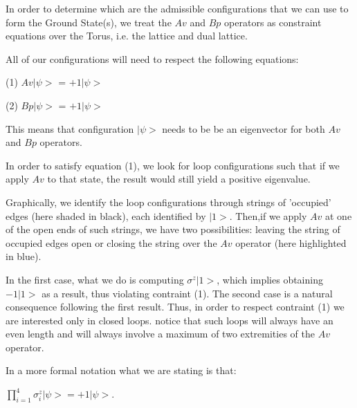 \documentclass[12pt]{report}
\begin{document}
	
	\begin{minipage}{1\textwidth}
		
		In order to determine which are the admissible configurations that we can use to form the Ground State(s), we treat the $Av$ and $Bp$ operators as constraint equations over the Torus, i.e. the lattice and dual lattice.\newline
		
		All of our configurations will need to respect the following equations:\newline
		
		\begin{center}
		 (1)	$Av|\psi>$ = $+1|\psi>$
		\end{center}
		
		\begin{center}
		 (2)	$Bp|\psi>$ = $+1|\psi>$
		\end{center}
		
		This means that configuration $|\psi>$ needs to be be an eigenvector for both $Av$ and $Bp$ operators. \newline
		
		In order to satisfy equation (1), we look for loop configurations such that if we apply $Av$ to that state, the result would still yield a positive eigenvalue.\newline
		
		Graphically, we identify the loop configurations through strings of 'occupied' edges (here shaded in black), each identified by $|1>$. Then,if we apply $Av$ at one of the open ends of such strings, we have two possibilities: leaving the string of occupied edges open or closing the string over the $Av$ operator (here highlighted in blue).\newline
		
		
		In the first case, what we do is computing $\sigma^{z} |1>$, which implies obtaining $-1|1>$ as a result, thus violating contraint (1). The second case is a natural consequence following the first result. Thus, in order to respect contraint (1) we are interested only in closed loops. notice that such loops will always have an even length and will always involve a maximum of two extremities of the $Av$ operator.\newline
		
		In a more formal notation what we are stating is that:\newline
		
		\begin{center}
			$\prod_{i=1}^{4} \sigma_{i}^{z} |\psi> = +1 |\psi>$. \newline
		\end{center}
		

\end{minipage}
\end{document}
